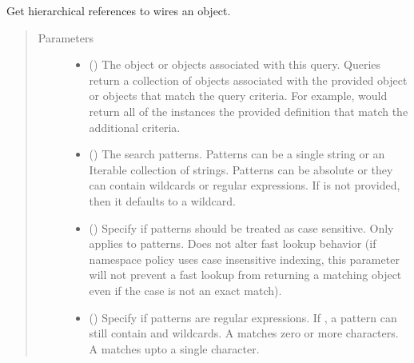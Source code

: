 \documentclass[letterpaper,10pt,english,openany,oneside]{sphinxmanual}
\begin{document}
\begin{fulllineitems}
\label{\detokenize{reference/classes/generated/spydrnet.get_hwires:spydrnet.get_hwires}}
Get hierarchical references to wires  an object.
\begin{quote}\begin{description}
\item[{Parameters}] \leavevmode\begin{itemize}
\item {} 
 () \textendash{} The object or objects associated with this query. Queries return a collection of objects associated with the
provided object or objects that match the query criteria. For example,  would
return all of the instances  the provided definition that match the additional criteria.

\item {} 
 () \textendash{} The search patterns. Patterns can be a single string or an Iterable collection of strings. Patterns can be
absolute or they can contain wildcards or regular expressions. If  is not provided, then it defaults
to a wildcard.

\item {} 
 () \textendash{} Specify if patterns should be treated as case sensitive. Only applies to patterns. Does not alter fast lookup
behavior (if namespace policy uses case insensitive indexing, this parameter will not prevent a fast lookup
from returning a matching object even if the case is not an exact match).

\item {} 
 () \textendash{} Specify if patterns are regular expressions. If , a pattern can still contain \sphinxtitleref{*} and  wildcards. A
\sphinxtitleref{*} matches zero or more characters. A  matches upto a single character.


\end{itemize}
\end{description}
\end{quote}
\end{fulllineitems}
\end{document}
